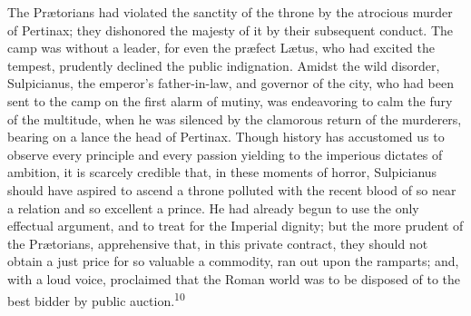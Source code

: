 


The Prætorians had violated the sanctity of the throne by the
atrocious murder of Pertinax; they dishonored the majesty of it
by their subsequent conduct. The camp was without a leader, for
even the præfect Lætus, who had excited the tempest, prudently
declined the public indignation. Amidst the wild disorder,
Sulpicianus, the emperor’s father-in-law, and governor of the
city, who had been sent to the camp on the first alarm of mutiny,
was endeavoring to calm the fury of the multitude, when he was
silenced by the clamorous return of the murderers, bearing on a
lance the head of Pertinax. Though history has accustomed us to
observe every principle and every passion yielding to the
imperious dictates of ambition, it is scarcely credible that, in
these moments of horror, Sulpicianus should have aspired to
ascend a throne polluted with the recent blood of so near a
relation and so excellent a prince. He had already begun to use
the only effectual argument, and to treat for the Imperial
dignity; but the more prudent of the Prætorians, apprehensive
that, in this private contract, they should not obtain a just
price for so valuable a commodity, ran out upon the ramparts;
and, with a loud voice, proclaimed that the Roman world was to be
disposed of to the best bidder by public auction.\textsuperscript{10}


